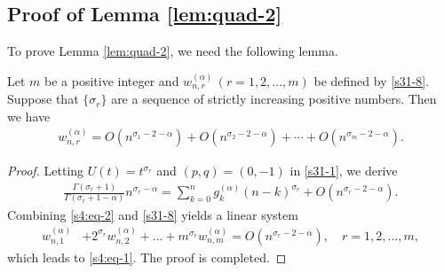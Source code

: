 \documentclass[10pt]{siamltex}
\begin{document}
\subsection{Proof of Lemma \ref{lem:quad-2}}
To prove Lemma \ref{lem:quad-2}, we need the following lemma.
\begin{lemma}\label{lm4.2}
Let $m$ be a positive integer and  $w_{n,r}^{(\alpha)}\,(r=1,2,...,m)$  be defined by \eqref{s31-8}.
Suppose that $\{\sigma_r\}$ are a sequence of strictly increasing  positive numbers.
Then we have
\begin{equation}\label{s4:eq-1}\begin{aligned}
w_{n,r}^{(\alpha)}
= O(n^{\sigma_1-2-\alpha})+O(n^{\sigma_2-2-\alpha})+\cdots+O(n^{\sigma_m-2-\alpha}).
\end{aligned}\end{equation}
\end{lemma}
\begin{proof}
Letting $U(t)=t^{\sigma_r}$ and $(p,q)=(0,-1)$ in \eqref{s31-1}, we derive
\begin{equation}\label{s4:eq-2}\begin{aligned}
\frac{\Gamma(\sigma_r+1)}{\Gamma(\sigma_r+1-\alpha)}n^{\sigma_r-\alpha}
=\sum_{k=0}^{n}g^{(\alpha)}_{k}(n-k)^{\sigma_r}
+O({n}^{\sigma_r-2-\alpha}).
\end{aligned}\end{equation}
Combining \eqref{s4:eq-2} and \eqref{s31-8} yields a linear system
\begin{equation}\label{s4:eq-4}\begin{aligned}
w_{n,1}^{(\alpha)}&+2^{\sigma_r}w_{n,2}^{(\alpha)}+...+m^{\sigma_r}w_{n,m}^{(\alpha)}
=O(n^{\sigma_r-2-\alpha}),{\quad}r=1,2,...,m,
\end{aligned}\end{equation}
which leads to \eqref{s4:eq-1}. The proof is completed.
\end{proof}
\end{document}
